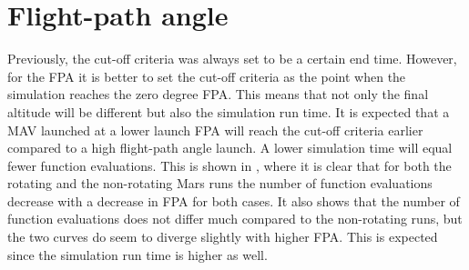 \section{Flight-path angle}
\label{sec:flightPathAngle}
Previously, the cut-off criteria was always set to be a certain end time. However, for the \ac{FPA} it is better to set the cut-off criteria as the point when the simulation reaches the zero degree \ac{FPA}. This means that not only the final altitude will be different but also the simulation run time. It is expected that a \ac{MAV} launched at a lower launch \ac{FPA} will reach the cut-off criteria earlier compared to a high flight-path angle launch. A lower simulation time will equal fewer function evaluations. This is shown in , where it is clear that for both the rotating and the non-rotating Mars runs the number of function evaluations decrease with a decrease in \ac{FPA} for both cases. It also shows that the number of function evaluations does not differ much compared to the non-rotating runs, but the two curves do seem to diverge slightly with higher \ac{FPA}. This is expected since the simulation run time is higher as well.  





%




